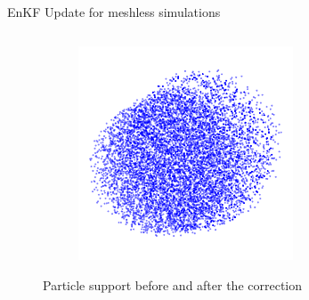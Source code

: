 \documentclass[aspectratio=169]{beamer} %
\begin{document}
\begin{frame}{EnKF Update for meshless simulations}
\begin{columns}[t]
\begin{column}{0.3\textwidth}
\begin{figure}
\begin{subfigure}{\textwidth}
                \end{subfigure}
                \begin{subfigure}{\textwidth}
                    \centering
                    \includegraphics[width=0.7\textwidth]{images/all_particles.pdf}
                \end{subfigure}
                \caption*{Particle support before and after the correction}
            \end{figure}
        \end{column}
    \end{columns}
\end{frame}
\end{document}
